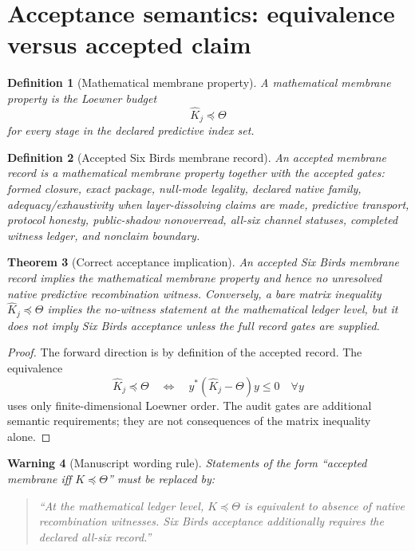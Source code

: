 \documentclass[11pt]{article}
\newtheorem{theorem}{Theorem}[section]
\newtheorem{definition}[theorem]{Definition}
\newtheorem{warning}[theorem]{Warning}
\newcommand{\Loewner}{\preceq}
\begin{document}
\section{Acceptance semantics: equivalence versus accepted claim}

\begin{definition}[Mathematical membrane property]
A mathematical membrane property is the Loewner budget
\[
  \widehat K_j\Loewner\Theta
\]
for every stage in the declared predictive index set.
\end{definition}

\begin{definition}[Accepted Six Birds membrane record]
An accepted membrane record is a mathematical membrane property together with the accepted gates:
formed closure, exact package, null-mode legality, declared native family, adequacy/exhaustivity when layer-dissolving claims are made, predictive transport, protocol honesty, public-shadow nonoverread, all-six channel statuses, completed witness ledger, and nonclaim boundary.
\end{definition}

\begin{theorem}[Correct acceptance implication]
An accepted Six Birds membrane record implies the mathematical membrane property and hence no unresolved native predictive recombination witness.  Conversely, a bare matrix inequality $\widehat K_j\Loewner\Theta$ implies the no-witness statement at the mathematical ledger level, but it does not imply Six Birds acceptance unless the full record gates are supplied.
\end{theorem}

\begin{proof}
The forward direction is by definition of the accepted record.  The equivalence
\[
  \widehat K_j\Loewner\Theta
  \quad\Longleftrightarrow\quad
  y^*(\widehat K_j-\Theta)y\le0\quad\forall y
\]
uses only finite-dimensional Loewner order.  The audit gates are additional semantic requirements; they are not consequences of the matrix inequality alone.
\end{proof}

\begin{warning}[Manuscript wording rule]
Statements of the form ``accepted membrane iff $K\preceq\Theta$'' must be replaced by:
\begin{quote}
``At the mathematical ledger level, $K\preceq\Theta$ is equivalent to absence of native recombination witnesses.  Six Birds acceptance additionally requires the declared all-six record.''
\end{quote}
\end{warning}
\end{document}
